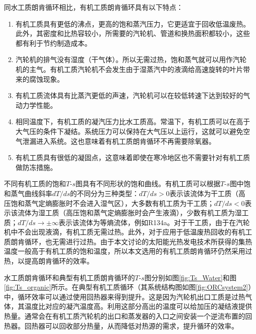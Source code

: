   同水工质朗肯循环相比，有机工质朗肯循环具有以下特点：
  \begin{enumerate}[label=(\arabic*)]
  \item 有机工质具有更低的沸点，更高的饱和蒸汽压力，它更适宜于回收低温废热。此外，其密度和比热容较小，所需要的汽轮机、管道和换热面积都较小，这些都有利于节约制造成本。
  \item 汽轮机的排气没有湿度（干气体）。所以无需过热，饱和蒸气就可以用作汽轮机的主气。有机工质汽轮机不会发生由于湿蒸汽中的液滴给高速旋转的叶片带来的腐蚀现象。
  \item 有机工质流体具有比蒸汽更低的声速，汽轮机可以在较低转速下达到较好的气动力学性能。
  \item 相同温度下，有机工质的凝汽压力比水工质高。常温下，有机工质可以在高于大气压的条件下凝结。系统压力可以保持在大气压以上运行，这就可以避免空气泄漏进入系统。这也意味着有机工质朗肯循环不再需要除氧器。
  \item 有机工质具有很低的凝固点，这意味着即使在寒冷地区也不需要针对有机工质做防冻措施。
  \end{enumerate}

不同有机工质的饱和$T$-$s$图具有不同形状的饱和曲线。有机工质可以根据$T$-$s$图中饱和蒸气曲线斜率$dT/ds$的不同分为三种类型：$dT / ds > 0$表示该流体为干工质（高压饱和蒸气定熵膨胀时不会进入湿气区），大多数有机工质为干工质；$dT / ds < 0$表示该流体为湿工质（高压饱和蒸气定熵膨胀时会产生液滴），少数有机工质为湿工质；$dT/ds \rightarrow \pm\infty$表示该流体为等熵流体，例如R134a。对于干工质，由于在汽轮机中不会出现液滴，有机工质无需过热。此外，对于应用于低温废热回收的有机工质朗肯循环，也无需进行过热。由于本文讨论的太阳能光热发电技术所获得的集热温度一般高于有机工质的饱和温度，所以本文选用的有机工质朗肯循环仍然采用过热，以提高朗肯循环的效率。

水工质朗肯循环和典型有机工质朗肯循环的$T$-$s$图分别如图\ref{fig:Ts_Water}和图\ref{fig:Ts_organic}所示。在典型有机工质循环（其系统结构图如图\ref{fig:ORCsystem2}）中，循环效率可以通过使用回热器来得到提升。这是因为汽轮机出口工质是过热气体，其温度比对应的凝汽温度高。利用这部分高出的温度可以给加压的凝结液提供热量。通常会在有机工质汽轮机的出口和蒸发器的入口之间安装一个逆流布置的回热器。回热器可以回收部分热量，从而降低对热源的需求，提升循环的效率。

